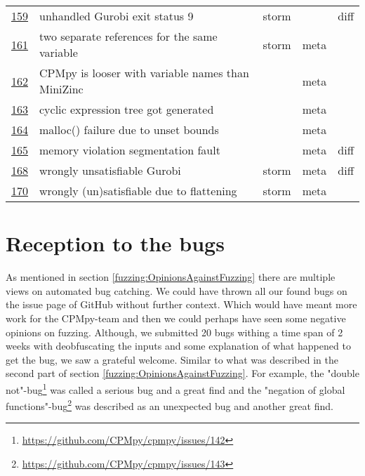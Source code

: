 \begin{table}[]
\begin{tabular}{lllll}
		\href{https://github.com/CPMpy/cpmpy/issues/159}{159} & unhandled Gurobi exit status 9                    & storm &       & diff \\
		\href{https://github.com/CPMpy/cpmpy/issues/161}{161} & two separate references for the same variable     & storm & meta  &      \\
		\href{https://github.com/CPMpy/cpmpy/issues/162}{162} & CPMpy is looser with variable names than MiniZinc &       & meta  &      \\
		\href{https://github.com/CPMpy/cpmpy/issues/163}{163} & cyclic expression tree got generated               &       & meta  &      \\
		\href{https://github.com/CPMpy/cpmpy/issues/164}{164} & malloc() failure due to unset bounds              &       & meta  &      \\
		\href{https://github.com/CPMpy/cpmpy/issues/165}{165} & memory violation segmentation fault               &       & meta  & diff \\
		\href{https://github.com/CPMpy/cpmpy/issues/168}{168} & wrongly unsatisfiable Gurobi                      & storm & meta  & diff \\
		\href{https://github.com/CPMpy/cpmpy/issues/170}{170} & wrongly (un)satisfiable due to flattening         & storm & meta  &      \\ \bottomrule
	\end{tabular}
\end{table}


\section{Reception to the bugs} 
As mentioned in section \ref{fuzzing:OpinionsAgainstFuzzing} there are multiple views on automated bug catching. We could have thrown all our found bugs on the issue page of GitHub without further context. Which would have meant more work for the CPMpy-team and then we could perhaps have seen some negative opinions on fuzzing. 
Although, we submitted 20 bugs withing a time span of 2 weeks with deobfuscating the inputs and some explanation of what happened to get the bug, we saw a grateful welcome. Similar to what was described in the second part of section \ref{fuzzing:OpinionsAgainstFuzzing}. 
For example, the "double not"-bug\footnote{\url{https://github.com/CPMpy/cpmpy/issues/142}} was called a serious bug and a great find and 
the "negation of global functions"-bug\footnote{\url{https://github.com/CPMpy/cpmpy/issues/143}} was described as an unexpected bug and another great find.

